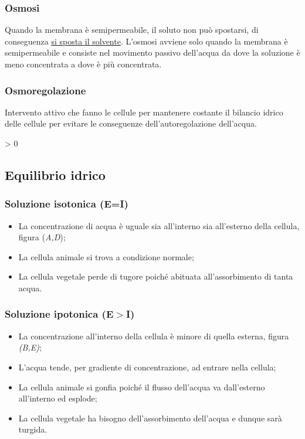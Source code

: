 \documentclass{article}
\makeatletter
\newcommand{\wrapfill}{
    \par
    \ifnum \value{WF@wrappedlines} > 0
        \addtocounter{WF@wrappedlines}{-1}%
        \null\vspace{
            \arabic{WF@wrappedlines}
            \baselineskip
        }
        \WFclear
    \fi
    \phantom{}
}
\makeatother
\begin{document}
\subsubsection{Osmosi}
Quando la membrana è semipermeabile, il soluto non può spostarsi, di conseguenza
\underline{si sposta il solvente}. L'osmosi avviene solo quando la membrana è semipermeabile
e consiste nel movimento passivo dell'acqua da dove la soluzione è meno concentrata a dove è
più concentrata.

\subsubsection{Osmoregolazione}
Intervento attivo che fanno le cellule per mantenere costante il bilancio idrico delle cellule
per evitare le conseguenze dell'autoregolazione dell'acqua.
\wrapfill

\subsection{Equilibrio idrico}
\subsubsection{Soluzione isotonica (E=I)}
\begin{itemize}
    \item La concentrazione di acqua è uguale sia all'interno sia all'esterno della cellula,
        figura (\textit{A,D});
    \item La cellula animale si trova a condizione normale;
    \item La cellula vegetale perde di tugore poiché abituata all'assorbimento di tanta acqua.
\end{itemize}

\subsubsection{Soluzione ipotonica (E$>$I)}
\begin{itemize}
    \item La concentrazione all'interno della cellula è minore di quella esterna,
        figura \textit{(B,E)};
    \item L'acqua tende, per gradiente di concentrazione, ad entrare nella cellula;
    \item La cellula animale si gonfia poiché il flusso dell'acqua va dall'esterno all'interno
        ed esplode;
    \item La cellula vegetale ha bisogno dell'assorbimento dell'acqua e dunque sarà turgida.
\end{itemize}
\end{document}
